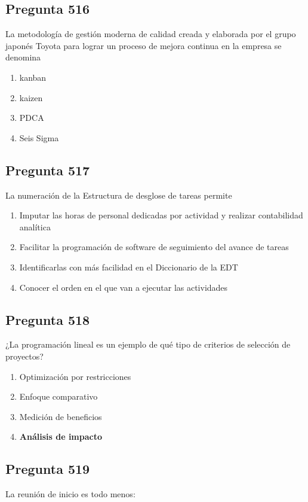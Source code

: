 \documentclass[11pt,a4paper]{article}
\begin{document}
\subsection*{Pregunta 516}
La metodología de gestión moderna de calidad creada y elaborada por el grupo japonés Toyota para lograr un proceso de mejora continua en la empresa se denomina

\begin{enumerate}[label=\alph*)]
  \item kanban
  \item kaizen
  \item PDCA
  \item Seis Sigma
\end{enumerate}

\subsection*{Pregunta 517}
La numeración de la Estructura de desglose de tareas permite

\begin{enumerate}[label=\alph*)]
  \item Imputar las horas de personal dedicadas por actividad y realizar contabilidad analítica
  \item Facilitar la programación de software de seguimiento del avance de tareas
  \item Identificarlas con más facilidad en el Diccionario de la EDT
  \item Conocer el orden en el que van a ejecutar las actividades
\end{enumerate}

\subsection*{Pregunta 518}
¿La programación lineal es un ejemplo de qué tipo de criterios de selección de proyectos?

\begin{enumerate}[label=\alph*)]
  \item Optimización por restricciones
  \item Enfoque comparativo
  \item Medición de beneficios
  \item \textbf{Análisis de impacto}
\end{enumerate}

\subsection*{Pregunta 519}
La reunión de inicio es todo menos:
\end{document}
